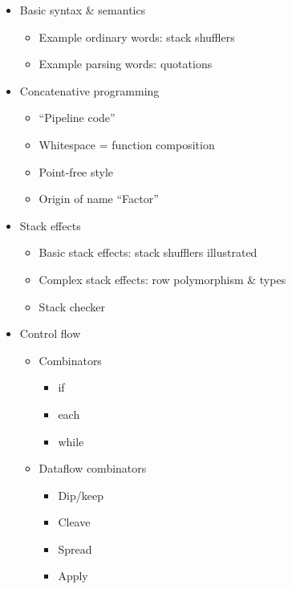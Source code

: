 \begin{itemize}

\item Basic syntax \& semantics
      \begin{itemize}
        \item Example ordinary words: stack shufflers
        \item Example parsing words: quotations
      \end{itemize}

\item Concatenative programming
      \begin{itemize}
        \item ``Pipeline code''
        \item Whitespace = function composition
        \item Point-free style
        \item Origin of name ``Factor''
      \end{itemize}

\item Stack effects
      \begin{itemize}
        \item Basic stack effects: stack shufflers illustrated
        \item Complex stack effects: row polymorphism \& types
        \item Stack checker
      \end{itemize}

\item Control flow
      \begin{itemize}
        \item Combinators
              \begin{itemize}
                \item if
                \item each
                \item while
              \end{itemize}
        \item Dataflow combinators
              \begin{itemize}
                \item Dip/keep
                \item Cleave
                \item Spread
                \item Apply
              \end{itemize}
      \end{itemize}


\end{itemize}
